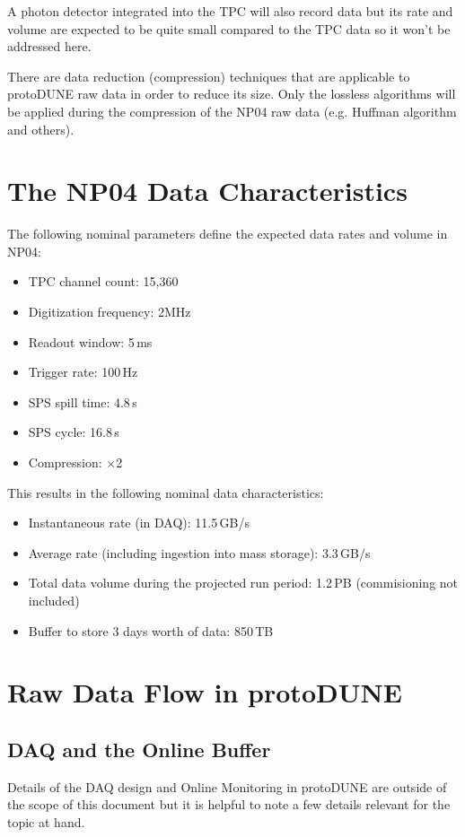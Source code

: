 \documentclass[a4paper]{jpconf}
\newcommand{\pd}{protoDUNE\xspace}
\begin{document}
A photon detector integrated into the TPC will also record data but its rate and volume are
expected to be quite small compared to the TPC data so it won't be addressed here.

There are data reduction (compression) techniques that are applicable to \pd raw data in order to reduce its size. 
Only the lossless algorithms will be applied during the compression of the NP04 raw data
(e.g. Huffman algorithm and others).

\section{The NP04 Data Characteristics}
\label{sec:np04_data_rate}
The following nominal parameters define the expected data rates and volume in NP04:
\begin{itemize}
\item TPC channel count: 15,360
\item Digitization frequency: 2MHz
\item Readout window: 5\,ms
\item Trigger rate: 100\,Hz
\item SPS spill time: 4.8\,s
\item SPS cycle: 16.8\,s
\item Compression: $\times$2
\end{itemize}
\noindent This results in the following nominal data characteristics:
\begin{itemize}
\item Instantaneous rate (in DAQ): 11.5\,GB/s
\item Average rate (including ingestion into mass storage): 3.3\,GB/s
\item Total data volume during the projected run period: 1.2\,PB (commisioning not included)
\item Buffer to store 3 days worth of data: 850\,TB

\end{itemize}


\section{Raw Data Flow in \pd}
\label{sec:raw_concept}
\subsection{DAQ and the Online Buffer}
Details of the DAQ design and Online Monitoring in \pd are outside of the scope
of this document but it is helpful to note a few details relevant for the topic at hand.
\end{document}
